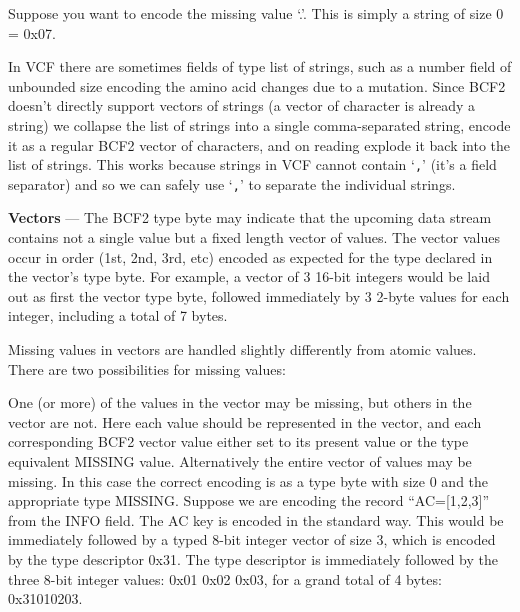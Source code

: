 \documentclass[8pt]{article}
\begin{document}
Suppose you want to encode the missing value `.'.
This is simply a string of size 0 = 0x07.

\vspace{0.3cm}
In VCF there are sometimes fields of type list of strings, such as a number field of unbounded size encoding the amino acid changes due to a mutation.
Since BCF2 doesn't directly support vectors of strings (a vector of character is already a string) we collapse the list of strings into a single comma-separated string, encode it as a regular BCF2 vector of characters, and on reading explode it back into the list of strings.
This works because strings in VCF cannot contain `{\tt ,}' (it's a field separator) and so we can safely use `{\tt ,}' to separate the individual strings.

%

\vspace{0.3cm}

\textbf{Vectors} --- The BCF2 type byte may indicate that the upcoming data stream contains not a single value but a fixed length vector of values.
The vector values occur in order (1st, 2nd, 3rd, etc) encoded as expected for the type declared in the vector's type byte.
For example, a vector of 3 16-bit integers would be laid out as first the vector type byte, followed immediately by 3 2-byte values for each integer, including a total of 7 bytes.

Missing values in vectors are handled slightly differently from atomic values.
There are two possibilities for missing values:

One (or more) of the values in the vector may be missing, but others in the vector are not.
Here each value should be represented in the vector, and each corresponding BCF2 vector value either set to its present value or the type equivalent MISSING value.
Alternatively the entire vector of values may be missing.
In this case the correct encoding is as a type byte with size 0 and the appropriate type MISSING.
Suppose we are encoding the record ``AC=[1,2,3]'' from the INFO field.
The AC key is encoded in the standard way.
This would be immediately followed by a typed 8-bit integer vector of size 3, which is encoded by the type descriptor 0x31.
The type descriptor is immediately followed by the three 8-bit integer values: 0x01 0x02 0x03, for a grand total of 4 bytes: 0x31010203.
\end{document}
